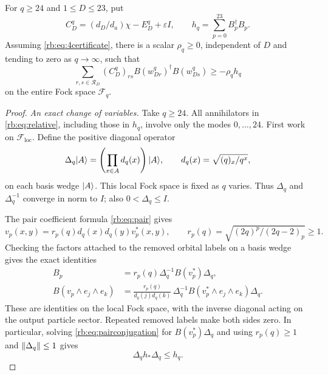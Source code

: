 \begin{lemma}\label{rb:lem:transfer}
For $q\ge24$ and $1\le D\le23$, put
\[
 C_D^q=(d_D/d_a)\chi-E_D^q+\varepsilon I,
 \qquad h_q=\sum_{p=0}^{23}B_p^\dagger B_p.
\]
Assuming \eqref{rb:eq:4certificate}, there is a scalar $\rho_q\ge0$,
independent of $D$ and tending to zero as $q\to\infty$, such that
\begin{equation}\label{rb:eq:relative}
 \sum_{r,s\in\mathcal R_D}(C_D^q)_{rs}
 B(w_{Dr}^q)^\dagger B(w_{Ds}^q)
 \ge-\rho_qh_q
\end{equation}
on the entire Fock space $\mathcal F_q$.
\end{lemma}
\begin{proof}
\emph{An exact change of variables.}
Take $q\ge24$.  All annihilators in \eqref{rb:eq:relative}, including those
in $h_q$, involve only the modes $0,\ldots,24$. First work on
$\mathcal F_{\mathrm{loc}}$. Define the positive diagonal operator
\[
 \Delta_q\lvert A\rangle=\left(\prod_{x\in A}d_q(x)\right)\lvert A\rangle,
 \qquad d_q(x)=\sqrt{(q)_x/q^x},
\]
on each basis wedge $\lvert A\rangle$.  This local Fock space is fixed as $q$
varies.  Thus $\Delta_q$ and $\Delta_q^{-1}$ converge in norm to $I$;
also $0<\Delta_q\le I$.

The pair coefficient formula \eqref{rb:eq:pair} gives
\[
 v_p(x,y)=r_p(q)d_q(x)d_q(y)v_p^*(x,y),
 \qquad r_p(q)=\sqrt{(2q)^p/(2q-2)_p}\ge1.
\]
Checking the factors attached to the removed orbital labels on a basis
wedge gives the exact identities
\begin{align}
 B_p&=r_p(q)\Delta_q^{-1}B(v_p^*)\Delta_q,
       \label{rb:eq:pairconjugation}\\
 B(v_p\wedge e_j\wedge e_k)
 &=\frac{r_p(q)}{d_q(j)d_q(k)}\,
   \Delta_q^{-1}B(v_p^*\wedge e_j\wedge e_k)\Delta_q.
       \label{rb:eq:fourconjugation}
\end{align}
These are identities on the local Fock space, with the inverse diagonal
acting on the output particle sector.  Repeated removed labels make both
sides zero.  In particular, solving \eqref{rb:eq:pairconjugation} for
$B(v_p^*)\Delta_q$ and using $r_p(q)\ge1$ and $\lVert \Delta_q\rVert\le1$
gives
\begin{equation}\label{rb:eq:pairenergytransfer}
 \Delta_q h_*\Delta_q\le h_q.
\end{equation}


\end{proof}
